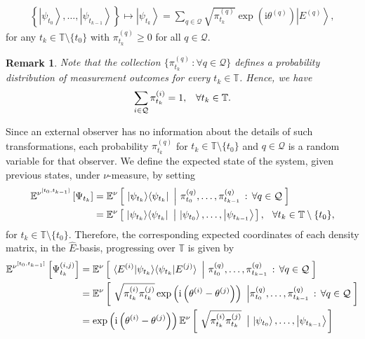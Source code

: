 \documentclass[12pt,a4paper]{article}
\newtheorem{rem}[thm]{Remark}
\def\T{\mathbb{T}}
\begin{document}
\begin{align}
\left\{\left|\psi_{t_{0}}\right\rangle, \ldots, \left|\psi_{t_{k-1}}\right\rangle \right\} \mapsto \left|\psi_{t_{k}}\right\rangle = \sum_{q\in\mathcal{Q}} \sqrt{\pi_{t_{k}}^{(q)}} \exp\left( \text{i} \theta^{(q)} \right) \left|E^{(q)}\right\rangle, \label{mappingexpression}
\end{align}
for any $t_{k}\in\T\setminus\{t_0\}$ with $\pi_{t_{k}}^{(q)}\geq 0$ for all $q\in\mathcal{Q}$. 
\begin{rem}{\em
Note that the collection $\{\pi_{t_{k}}^{(q)} \, : \forall q\in\mathcal{Q}\}$ defines a probability distribution of measurement outcomes for every $t_{k}\in\T$. Hence, we have 
\begin{align}
\sum_{i\in\mathcal{Q}}\pi_{t_{k}}^{(i)} = 1, \,\,\,\,\, \forall t_{k}\in\T.\notag 
\end{align}
}
\end{rem}
Since an external observer has no information about the details of such transformations, each probability $\pi_{t_{k}}^{(q)}$ for $t_k\in\T\setminus\{t_0\}$ and $q\in\mathcal{Q}$ is a random variable for that observer. We define the expected state of the system, given previous states, under $\nu$-measure, by setting
\begin{align}
\mathbb{E}^{\nu^{[t_{0},t_{k-1}]}}\left[\Psi_{t_{k}}\right] &= \mathbb{E}^{\nu}\left[ \,\, |\psi_{t_{k}}\rangle \langle\psi_{t_{k}}|  \,\, \left| \,\, \pi_{t_{0}}^{(q)}, \ldots, \pi_{t_{k-1}}^{(q)} \,: \, \forall q\in\mathcal{Q} \, \right.\right] \notag \\
&= \mathbb{E}^{\nu}\left[ \,\, |\psi_{t_{k}}\rangle \langle\psi_{t_{k}}|  \,\, \left| \,\, \left|\psi_{t_{0}}\right\rangle, \ldots, \left|\psi_{t_{k-1}}\right\rangle \right.\right], \hspace{0.1in} \text{$\forall t_{k}\in\T\setminus\{t_0\}$}, 
\end{align}
for $t_k\in\T\setminus\{t_0\}$. Therefore, the corresponding expected coordinates of each density matrix, in the $\hat{E}$-basis, progressing over $\T$ is given by
\begin{align}
\mathbb{E}^{\nu^{[t_{0},t_{k-1}]}}\left[\Psi_{t_{k}}^{(i,j)}\right] &= \mathbb{E}^{\nu}\left[ \,\, \langle E^{(i)} |\psi_{t_{k}}\rangle \langle \psi_{t_{k}}| E^{(j)} \rangle \,\, \left| \,\, \pi_{t_{0}}^{(q)}, \ldots, \pi_{t_{k-1}}^{(q)} \,: \, \forall q\in\mathcal{Q} \, \right.\right] \label{conditionalquantumexpressionfirst} \\
&= \mathbb{E}^{\nu}\left[ \,\,  \sqrt{\pi_{t_{k}}^{(i)}\pi_{t_{k}}^{(j)}}\exp\left( \text{i}\left( \theta^{(i)} - \theta^{(j)} \right) \right) \,\, \left| \pi_{t_{0}}^{(q)}, \ldots, \pi_{t_{k-1}}^{(q)} \,: \, \forall q\in\mathcal{Q} \, \right.\right] \notag \\
&= \exp\left( \text{i}\left( \theta^{(i)} - \theta^{(j)} \right) \right)\mathbb{E}^{\nu}\left[ \,\,  \sqrt{\pi_{t_{k}}^{(i)}\pi_{t_{k}}^{(j)}} \,\, \left| \,\, \left|\psi_{t_{0}}\right\rangle, \ldots, \left|\psi_{t_{k-1}}\right\rangle \right.\right] \label{conditionalquantumexpression}
\end{align}
\end{document}
